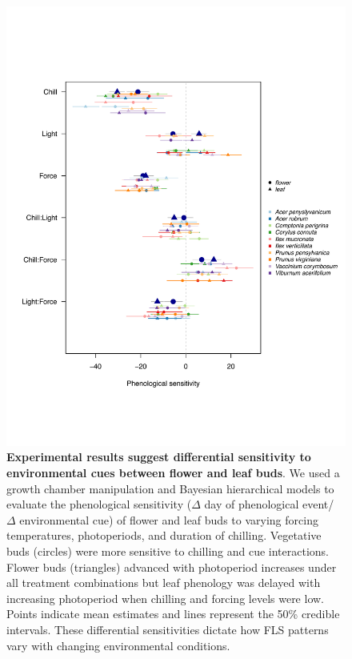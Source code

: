 \documentclass[11pt]{article}
\begin{document}
\begin{figure}[h!]
    \centering
         \includegraphics[width=\textwidth]{..//Plots/Flobuds_manuscript_figs/budburstvsflowering.pdf}
    \caption{\textbf{Experimental results suggest differential sensitivity to environmental cues between flower and leaf buds}. We used a growth chamber manipulation and Bayesian hierarchical models to evaluate the phenological sensitivity ($\Delta$ day of phenological event/ $\Delta$ environmental cue) of flower and leaf buds to varying forcing temperatures, photoperiods, and duration of chilling.   Vegetative buds (circles) were more sensitive to chilling and cue interactions. Flower buds (triangles) advanced with photoperiod increases under all treatment combinations but leaf phenology was delayed with increasing photoperiod when chilling and forcing levels were low. Points indicate mean estimates and lines represent the 50\% credible intervals. These differential sensitivities dictate how FLS patterns vary with changing environmental conditions.}
    \label{fig:model}
\end{figure}
\end{document}
